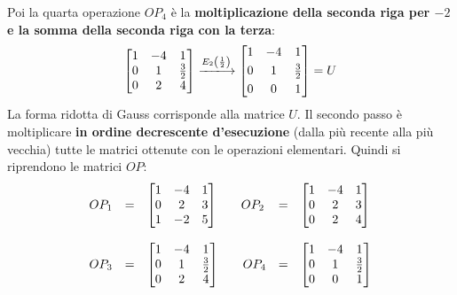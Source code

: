 \documentclass[a4paper]{article}
\makeatletter
\newenvironment{rowequmatbra}[1]{\left[\array{@{}#1@{}}}{\endarray\right]}
\makeatother
\begin{document}
	Poi la quarta operazione $OP_{4}$ è la \textbf{moltiplicazione della seconda riga per $-2$ e la somma della seconda riga con la terza}:
	\begin{equation*}
		\begin{rowequmatbra}{ccc}
			1 & -4 & 1 \\
			0 &  1 & \frac{3}{2} \\
			0 &  2 & 4
		\end{rowequmatbra} \xlongrightarrow{E_{2}\left(\frac{1}{2}\right)}
		\begin{rowequmatbra}{ccc}
			1 & -4 & 1 \\ [0.3em]
			0 &  1 & \frac{3}{2} \\ [0.3em]
			0 &  0 & 1
		\end{rowequmatbra} = U
	\end{equation*}
	La forma ridotta di Gauss corrisponde alla matrice $U$. Il \textcolor{Red3}{secondo passo} è moltiplicare \textbf{in ordine decrescente d'esecuzione} (dalla più recente alla più vecchia) tutte le matrici ottenute con le operazioni elementari. Quindi si riprendono le matrici $OP$:
	\begin{equation*}
		\begin{array}{lllll}
			OP_{1} & = & \begin{rowequmatbra}{ccc}
				1 & -4 & 1 \\
				0 &  2 & 3 \\
				1 & -2 & 5
			\end{rowequmatbra} \hspace{2em} OP_{2} & = & \begin{rowequmatbra}{ccc}
				1 & -4 & 1 \\
				0 &  2 & 3 \\
				0 &  2 & 4
			\end{rowequmatbra} \\
			\\
			OP_{3} & = & \begin{rowequmatbra}{ccc}
				1 & -4 & 1 \\
				0 &  1 & \frac{3}{2} \\
				0 &  2 & 4
			\end{rowequmatbra} \hspace{2em}	OP_{4} & = & \begin{rowequmatbra}{ccc}
				1 & -4 & 1 \\
				0 &  1 & \frac{3}{2} \\
				0 &  0 & 1
			\end{rowequmatbra}
		\end{array}
	\end{equation*}
\end{document}
